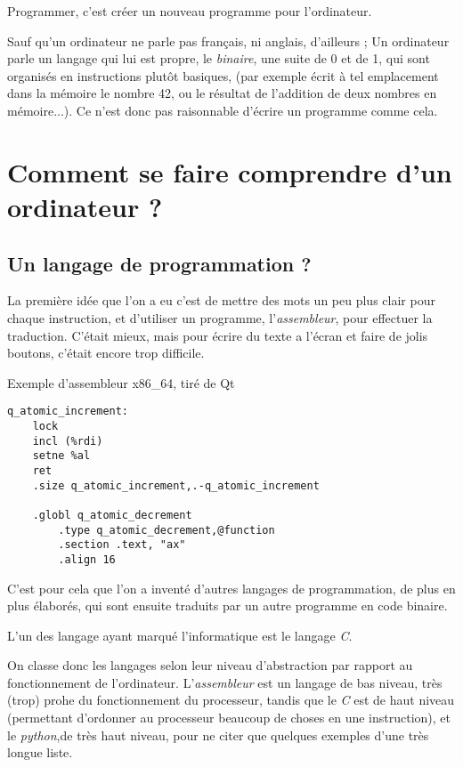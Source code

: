 Programmer, c'est créer un nouveau programme pour l'ordinateur.

Sauf qu'un ordinateur ne parle pas français, ni anglais, d'ailleurs ; Un ordinateur parle un
langage qui lui est propre, le \emph{binaire}, une suite de 0 et de 1, qui sont organisés en
instructions plutôt basiques, (par exemple écrit à tel emplacement dans la mémoire le
nombre 42, ou le résultat de l'addition de deux nombres en mémoire...). Ce n'est donc pas
raisonnable d'écrire un programme comme cela.
\section{Comment se faire comprendre d'un ordinateur ?}
\subsection{Un langage de programmation ?}
La première idée que l'on a eu c'est de mettre des mots un peu plus clair pour chaque
instruction, et d'utiliser un programme, l'\emph{assembleur}, pour effectuer la traduction. C'était
mieux, mais pour écrire du texte a l'écran et faire de jolis boutons, c'était encore trop
difficile.
\begin{listing}[h]
\caption{Exemple d'assembleur x86\_64, tiré de Qt}
\begin{verbatim}
q_atomic_increment:
	lock
	incl (%rdi)
	setne %al
	ret
	.size q_atomic_increment,.-q_atomic_increment

	.globl q_atomic_decrement
        .type q_atomic_decrement,@function
        .section .text, "ax"
        .align 16
\end{verbatim}
\end{listing}

C'est pour cela que l'on a inventé d'autres langages de programmation, de plus en plus
élaborés, qui sont ensuite traduits par un autre programme en code binaire.

L'un des langage ayant marqué l'informatique est le langage \emph{C}.

On classe donc les langages selon leur niveau d'abstraction par rapport au
fonctionnement de l'ordinateur. L'\emph{assembleur} est un langage de bas niveau, très (trop)
prohe du fonctionnement du processeur, tandis que le \emph{C} est de haut niveau (permettant
d'ordonner au processeur beaucoup de choses en une instruction), et le \emph{python},de très
haut niveau, pour ne citer que quelques exemples d'une très longue liste.%

